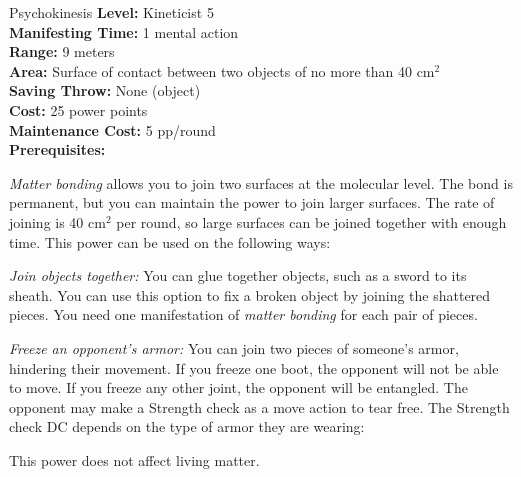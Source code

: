 {Psychokinesis}
{
	\textbf{Level:}
	Kineticist 5\\
	\textbf{Manifesting Time:}
	1 mental action\\
	\textbf{Range:}
	9 meters\\
	\textbf{Area:}
	Surface of contact between two objects of no more than 40 cm$^2$\\
	\textbf{Saving Throw:}
	None (object)\\
	\textbf{Cost:}
	25 power points\\
	\textbf{Maintenance Cost:}
	5 pp/round\\
	\textbf{Prerequisites:}
	\\
}
{
	\emph{Matter bonding} allows you to join two surfaces at the molecular level. The bond is permanent, but you can maintain the power to join larger surfaces. The rate of joining is 40 cm$^2$ per round, so large surfaces can be joined together with enough time. This power can be used on the following ways:

	\begin{enumerate*}
		\item \textit{Join objects together:} You can glue together objects, such as a sword to its sheath. You can use this option to fix a broken object by joining the shattered pieces. You need one manifestation of \emph{matter bonding} for each pair of pieces.

		\item \textit{Freeze an opponent's armor:} You can join two pieces of someone's armor, hindering their movement. If you freeze one boot, the opponent will not be able to move. If you freeze any other joint, the opponent will be entangled. The opponent may make a Strength check as a move action to tear free. The Strength check DC depends on the type of armor they are wearing:

	\end{enumerate*}

	This power does not affect living matter.
}
